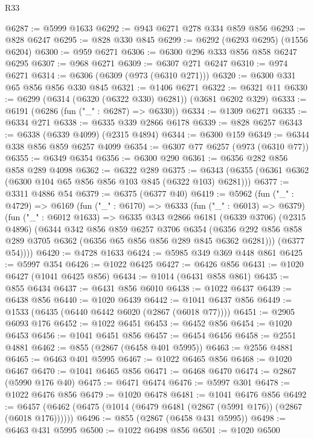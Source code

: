 \begin{lexlean}{R33}
\begin{coremodule}
@6287 := @5999 @1633
@6292 := @943 @6271 @278 @334 @859 @856
@6293 := @828 @6247
@6295 := @828 @330 @845
@6299 := @6292 (@6293 @6295) (@1556 @6204)
@6300 := @959 @6271
@6306 := @6300 @296 @333 @856 @858 @6247 @6295
@6307 := @968 @6271
@6309 := @6307 @271 @6247
@6310 := @974 @6271
@6314 := @6306 (@6309 (@973 (@6310 @271)))
@6320 := @6300 @331 @65 @856 @856 @330 @845
@6321 := @1406 @6271
@6322 := @6321 @11
@6330 := @6299 (@6314 (@6320 (@6322 @330) @6281)) (@3681 @6202 @329)
@6333 := @6191 (@6286 (fun ("_" : @6287) => @6330))
@6334 := @1309 @6271
@6335 := @6334 @271
@6338 := @6335 @339 @2866 @6178
@6339 := @828 @6257
@6343 := @6338 (@6339 @4099) (@2315 @4894)
@6344 := @6300 @159
@6349 := @6344 @338 @856 @859 @6257 @4099
@6354 := @6307 @77 @6257 (@973 (@6310 @77))
@6355 := @6349 @6354
@6356 := @6300 @290
@6361 := @6356 @282 @856 @858 @289 @4098
@6362 := @6322 @289
@6375 := @6343 (@6355 (@6361 @6362 (@6300 @104 @65 @856 @856 @103 @845 (@6322 @103) @6281)))
@6377 := @3311 @4886 @54
@6379 := @6375 (@6377 @40)
@6419 := @5962
    (fun ("_" : @4729) =>
    @6169
      (fun ("_" : @6170) =>
      @6333
        (fun ("_" : @6013) => @6379)
        (fun ("_" : @6012 @1633) =>
        @6335
          @343
          @2866
          @6181
          (@6339 @3706)
          (@2315 @4896)
          (@6344
            @342
            @856
            @859
            @6257
            @3706
            @6354
            (@6356 @292 @856 @858 @289 @3705 @6362 (@6356 @65 @856 @856 @289 @845 @6362 @6281)))
          (@6377 @54))))
@6420 := @4728 @1633
@6424 := @5985 @349 @369 @448 @861
@6425 := @5997 @354
@6426 := @1022 @6425
@6427 := @6426 @856
@6431 := @1020 @6427 (@1041 @6425 @856)
@6434 := @1014 (@6431 @858 @861)
@6435 := @855 @6434
@6437 := @6431 @856 @6010
@6438 := @1022 @6437
@6439 := @6438 @856
@6440 := @1020 @6439
@6442 := @1041 @6437 @856
@6449 := @1533 (@6435 (@6440 @6442 @6020 (@2867 (@6018 @77))))
@6451 := @2905 @6093 @176
@6452 := @1022 @6451
@6453 := @6452 @856
@6454 := @1020 @6453
@6456 := @1041 @6451 @856
@6457 := @6454 @6456
@6458 := @2551 @4881
@6462 := @855 (@2867 (@6458 @401 @5995))
@6463 := @2556 @4881
@6465 := @6463 @401 @5995
@6467 := @1022 @6465 @856
@6468 := @1020 @6467
@6470 := @1041 @6465 @856
@6471 := @6468 @6470
@6474 := @2867 (@5990 @176 @40)
@6475 := @6471 @6474
@6476 := @5997 @301
@6478 := @1022 @6476 @856
@6479 := @1020 @6478
@6481 := @1041 @6476 @856
@6492 := @6457 (@6462 (@6475 (@1014 (@6479 @6481 (@2867 (@5991 @176)) (@2867 (@6018 @176))))))
@6496 := @855 (@2867 (@6458 @431 @5995))
@6498 := @6463 @431 @5995
@6500 := @1022 @6498 @856
@6501 := @1020 @6500

\end{coremodule}
\end{lexlean}
